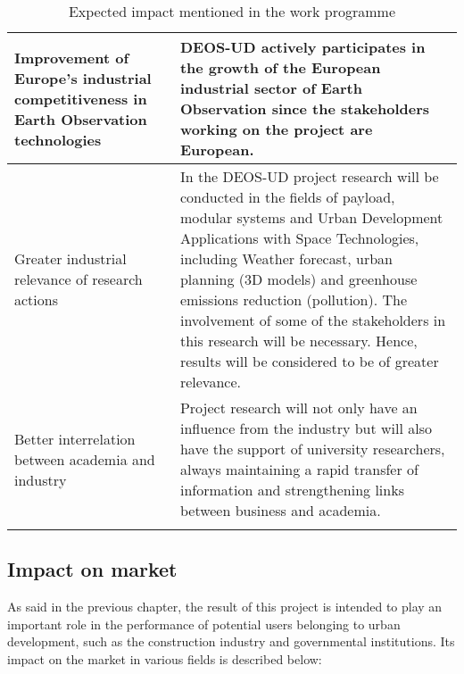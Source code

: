 \begin{longtable}{>{\raggedright\arraybackslash}p{3cm} p{11cm}}
	\midrule
	
	Improvement of Europe’s industrial competitiveness in Earth Observation technologies & DEOS-UD actively participates in the growth of the European industrial sector of Earth Observation since the stakeholders working on the project are European.\vspace{0.2cm}\\
	
	\midrule
	
	Greater industrial relevance of research actions & In the DEOS-UD project research will be conducted in the fields of payload, modular systems and Urban Development Applications with Space Technologies, including Weather forecast, urban planning (3D models) and greenhouse emissions reduction (pollution). The involvement of some of the stakeholders in this research will be necessary. Hence, results will be considered to be of greater relevance.\vspace{0.2cm}\\
	
	\midrule
	
	Better interrelation between academia and industry & Project research will not only have an influence from the industry but will also have the support of university researchers, always maintaining a rapid transfer of information and strengthening links between business and academia.\vspace{0.2cm}\\
	
	\bottomrule[2pt]
	
	\caption{Expected impact mentioned in the work programme}
\end{longtable}

\pagebreak

\subsection{Impact on market}

As said in the previous chapter, the result of this project is intended to play an important role in the performance of potential users belonging to urban development, such as the construction industry and governmental institutions. Its impact on the market in various fields is described below:

